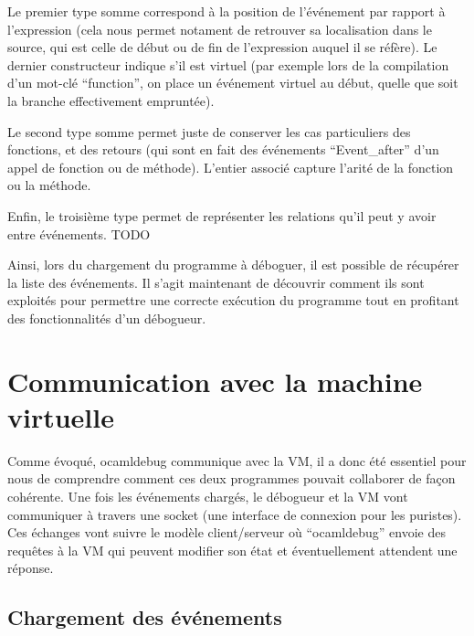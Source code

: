 \documentclass[11pt,a4paper]{report}
\begin{document}
Le premier type somme correspond à la position de l'événement par rapport à l'expression (cela nous permet notament de retrouver sa localisation dans le source, qui est celle de début ou de fin de l'expression auquel il se réfère). Le dernier constructeur indique s'il est virtuel (par exemple lors de la compilation d'un mot-clé ``function'', on place un événement virtuel au début, quelle que soit la branche effectivement empruntée).

\smallskip

Le second type somme permet juste de conserver les cas particuliers des fonctions, et des retours (qui sont en fait des événements ``Event\_after'' d'un appel de fonction ou de méthode). L'entier associé capture l'arité de la fonction ou la méthode.

\smallskip

Enfin, le troisième type permet de représenter les relations qu'il peut y avoir entre événements. TODO




\bigskip

Ainsi, lors du chargement du programme à déboguer, il est possible de récupérer la liste des événements. Il s'agit maintenant de découvrir comment ils sont exploités pour permettre une correcte exécution du programme tout en profitant des fonctionnalités d'un débogueur.

\section{Communication avec la machine virtuelle}

Comme évoqué, ocamldebug communique avec la VM, il a donc été essentiel pour nous de comprendre comment ces deux programmes pouvait collaborer de façon cohérente. Une fois les événements chargés, le débogueur et la VM vont communiquer à travers une socket (une interface de connexion pour les puristes). Ces échanges vont suivre le modèle client/serveur où ``ocamldebug'' envoie des requêtes à la VM qui peuvent modifier son état et éventuellement attendent une réponse.


\medskip

\subsection{Chargement des événements}
\end{document}
